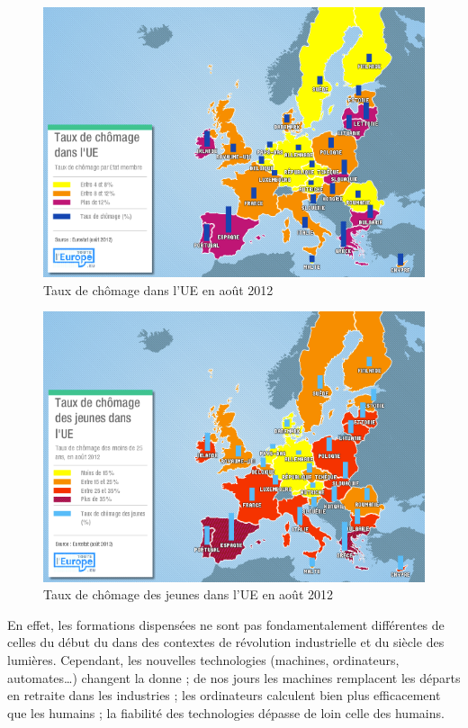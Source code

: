 \begin{figure}[p]
\centering
\includegraphics[width=0.98\linewidth]{figures/chom}
\caption{Taux de chômage dans l'UE en août 2012 \cite{chom}}
\label{chom}
\end{figure}
\begin{figure}[p]
\centering
\includegraphics[width=0.98\linewidth]{figures/chom_jeunes}
\caption{Taux de chômage des jeunes dans l'UE en août 2012 \cite{chom_jeunes}}
\label{chom_jeunes}
\end{figure}

En effet, les formations dispensées ne sont pas fondamentalement différentes de celles du début du   \cite{robinson2010paradigms} dans des contextes de révolution industrielle et du siècle des lumières. Cependant, les nouvelles technologies (machines, ordinateurs, automates\ldots) changent la donne ; de nos jours les machines remplacent les départs en retraite dans les industries ; les ordinateurs calculent bien plus efficacement que les humains ; la fiabilité des technologies dépasse de loin celle des humains.



